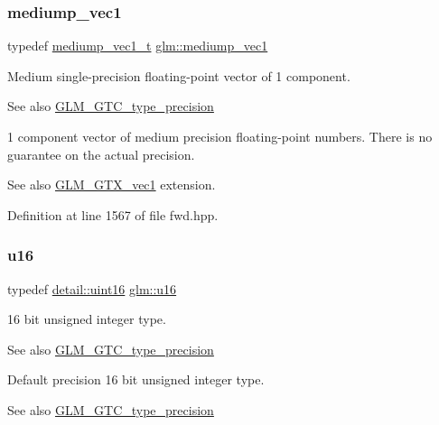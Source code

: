 \subsubsection{\texorpdfstring{mediump\+\_\+vec1}{mediump\_vec1}}
{\footnotesize\ttfamily typedef \hyperlink{namespaceglm_a34591cc7729d24d31e7c1af9ab86d8be}{mediump\+\_\+vec1\+\_\+t} \hyperlink{group__gtc__type__precision_ga1b734d715033ab3026b2fb27e1fb7d3e}{glm\+::mediump\+\_\+vec1}}

Medium single-\/precision floating-\/point vector of 1 component. \begin{DoxySeeAlso}{See also}
\hyperlink{group__gtc__type__precision}{G\+L\+M\+\_\+\+G\+T\+C\+\_\+type\+\_\+precision}
\end{DoxySeeAlso}
1 component vector of medium precision floating-\/point numbers. There is no guarantee on the actual precision. \begin{DoxySeeAlso}{See also}
\hyperlink{group__gtx__vec1}{G\+L\+M\+\_\+\+G\+T\+X\+\_\+vec1} extension. 
\end{DoxySeeAlso}


Definition at line 1567 of file fwd.\+hpp.

\mbox{\label{group__gtc__type__precision_gae7a1571503f83d2264ddfa705a6b082a}} 
\subsubsection{\texorpdfstring{u16}{u16}}
{\footnotesize\ttfamily typedef \hyperlink{namespaceglm_1_1detail_a47b2a7d006d187338e8031a352d1ce56}{detail\+::uint16} \hyperlink{group__gtc__type__precision_gae7a1571503f83d2264ddfa705a6b082a}{glm\+::u16}}

16 bit unsigned integer type. \begin{DoxySeeAlso}{See also}
\hyperlink{group__gtc__type__precision}{G\+L\+M\+\_\+\+G\+T\+C\+\_\+type\+\_\+precision}
\end{DoxySeeAlso}
Default precision 16 bit unsigned integer type. \begin{DoxySeeAlso}{See also}
\hyperlink{group__gtc__type__precision}{G\+L\+M\+\_\+\+G\+T\+C\+\_\+type\+\_\+precision} 
\end{DoxySeeAlso}


